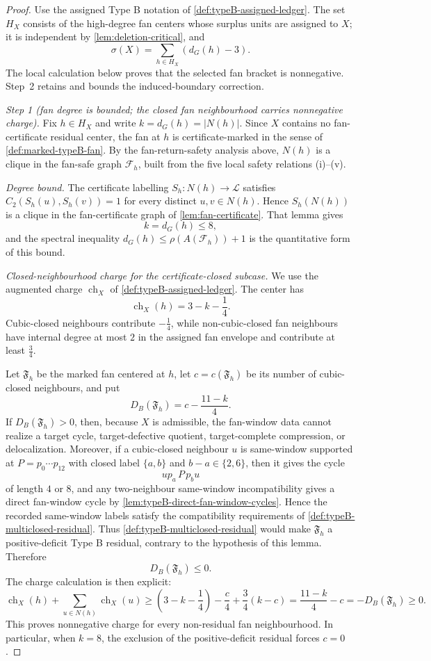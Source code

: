 \documentclass[11pt]{article}
\newcommand{\labels}{\mathcal L}
\newcommand{\ch}{\operatorname{ch}}
\newcommand{\Fsafe}{\mathcal F}
\begin{document}
\begin{proof}
Use the assigned Type B notation of \cref{def:typeB-assigned-ledger}.  The set
$H_X$ consists of the high-degree fan centers whose surplus units are assigned
to $X$; it is independent by \cref{lem:deletion-critical}, and
\[
\sigma(X)=\sum_{h\in H_X}(d_G(h)-3).
\]
The local calculation below proves that the selected fan bracket is
nonnegative.  Step~2 retains and bounds the induced-boundary correction.

\emph{Step 1 (fan degree is bounded; the closed fan neighbourhood carries nonnegative charge).}
Fix $h\in H_X$ and write $k=d_G(h)=|N(h)|$.  Since $X$ contains no
fan-certificate residual center, the fan at $h$ is certificate-marked in the
sense of \cref{def:marked-typeB-fan}.  By the fan-return-safety analysis above,
$N(h)$ is a clique in the fan-safe graph $\Fsafe_h$, built from the five local
safety relations (i)--(v).

\emph{Degree bound.}  The certificate labelling
$S_h:N(h)\to\labels$ satisfies $C_2(S_h(u),S_h(v))=1$ for every distinct
$u,v\in N(h)$.  Hence $S_h(N(h))$ is a clique in the fan-certificate graph of
\cref{lem:fan-certificate}.  That lemma gives
\[
k=d_G(h)\le 8 ,
\]
and the spectral inequality
$d_G(h)\le\rho(A(\Fsafe_h))+1$ is the quantitative form of this bound.

\emph{Closed-neighbourhood charge for the certificate-closed subcase.}  We use
the augmented charge $\ch_X$ of \cref{def:typeB-assigned-ledger}.  The center
has
\[
\ch_X(h)=3-k-\frac14.
\]
Cubic-closed neighbours contribute $-\tfrac14$, while non-cubic-closed fan
neighbours have internal degree at most $2$ in the assigned fan envelope and
contribute at least $\tfrac34$.

Let $\mathfrak F_h$ be the marked fan centered at $h$, let
$c=c(\mathfrak F_h)$ be its number of cubic-closed neighbours, and put
\[
D_B(\mathfrak F_h)=c-\frac{11-k}{4}.
\]
If $D_B(\mathfrak F_h)>0$, then, because $X$ is admissible, the fan-window data
cannot realize a target cycle, target-defective quotient, target-complete
compression, or delocalization.  Moreover, if a cubic-closed neighbour $u$ is
same-window supported at $P=p_0\cdots p_{12}$ with closed label
$\{a,b\}$ and $b-a\in\{2,6\}$, then it gives the cycle
\[
u p_a\,P\,p_b u
\]
of length $4$ or $8$, and any two-neighbour same-window incompatibility gives a
direct fan-window cycle by \cref{lem:typeB-direct-fan-window-cycles}.  Hence the
recorded same-window labels satisfy the compatibility requirements of
\cref{def:typeB-multiclosed-residual}.  Thus
\cref{def:typeB-multiclosed-residual} would make $\mathfrak F_h$ a
positive-deficit Type B residual, contrary to the hypothesis of this lemma.
Therefore
\[
D_B(\mathfrak F_h)\le0.
\]
The charge calculation is then explicit:
\[
\ch_X(h)+\sum_{u\in N(h)}\ch_X(u)
\ge
\left(3-k-\frac14\right)-\frac c4+\frac34(k-c)
=\frac{11-k}{4}-c
=-D_B(\mathfrak F_h)\ge0 .
\]
This proves nonnegative charge for every non-residual fan neighbourhood.  In
particular, when $k=8$, the exclusion of the positive-deficit residual forces
$c=0$.


\end{proof}
\end{document}
